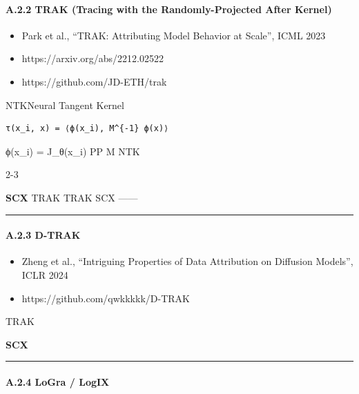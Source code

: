 \documentclass[
  12pt,
]{article}
\providecommand{\tightlist}{%
  \setlength{\itemsep}{0pt}\setlength{\parskip}{0pt}}
\begin{document}
\paragraph{A.2.2 TRAK (Tracing with the Randomly-Projected After
Kernel)}\label{a.2.2-trak-tracing-with-the-randomly-projected-after-kernel}

\begin{itemize}
\tightlist
\item
  \textbf{}Park et al., ``TRAK: Attributing Model Behavior at
  Scale'', ICML 2023
\item
  \textbf{}https://arxiv.org/abs/2212.02522
\item
  \textbf{}https://github.com/JD-ETH/trak
\end{itemize}

\textbf{} NTKNeural Tangent
Kernel

\begin{verbatim}
τ(x_i, x) = ⟨ϕ(x_i), M^{-1} ϕ(x)⟩
\end{verbatim}

 ϕ(x\_i) = J\_θ(x\_i)  PP M  NTK

\textbf{} 2-3 

\textbf{SCX }TRAK TRAK
SCX
------

\begin{center}\rule{0.5\linewidth}{0.5pt}\end{center}

\paragraph{A.2.3 D-TRAK}\label{a.2.3-d-trak}

\begin{itemize}
\tightlist
\item
  \textbf{}Zheng et al., ``Intriguing Properties of Data
  Attribution on Diffusion Models'', ICLR 2024
\item
  \textbf{}https://github.com/qwkkkkk/D-TRAK
\end{itemize}

\textbf{}TRAK


\textbf{SCX }

\begin{center}\rule{0.5\linewidth}{0.5pt}\end{center}

\paragraph{A.2.4 LoGra / LogIX}\label{a.2.4-logra-logix}
\end{document}

